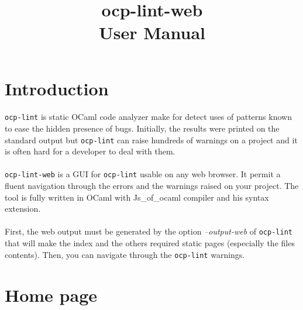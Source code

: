 \documentclass{article}
\title{
	ocp-lint-web\\
    User Manual
}
\date{}
\author{}
\begin{document}
\maketitle

\newpage

\tableofcontents

\newpage

\section{Introduction}
\vspace{\baselineskip}

\paragraph{}
\texttt{ocp-lint} is static OCaml code analyzer make for detect uses of patterns known to ease the hidden presence of bugs. Initially, the results were printed on the standard output but \texttt{ocp-lint} can raise hundreds of warnings on a project and it is often hard for a developer to deal with them.

\paragraph{}
\texttt{ocp-lint-web} is a GUI for \texttt{ocp-lint} usable on any web browser.
It permit a fluent navigation through the errors and the warnings raised on your project.
The tool is fully written in OCaml with Js\_of\_ocaml compiler and his syntax extension.

\paragraph{}
First, the web output must be generated by the option \textit{--output-web} of \texttt{ocp-lint} that will make the index and the others required static pages (especially the files contents).
Then, you can navigate through the \texttt{ocp-lint} warnings.

\newpage

\section{Home page}
\vspace{\baselineskip}
\end{document}
